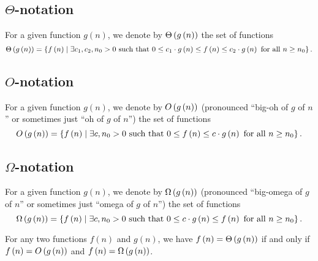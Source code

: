 \subsection{$\Theta$-notation}
\begin{definition}
For a given function $g \left(n\right)$, we denote by $\Theta\left(g \left(n\right) \right)$ the set of functions
\[
\Theta\left(g \left(n\right) \right) = \left\{f\left(n\right) \mid \exists c_1, c_2, n_0 > 0 \text{ such that } 0 \le c_1 \cdot g \left(n\right) \le f \left(n\right) \le c_2 \cdot g \left(n\right) \text{ for all } n \ge n_0 \right\}.
\]
\end{definition}

\subsection{$O$-notation}
\begin{definition}
For a given function $g \left(n\right)$, we denote by $O\left(g \left(n\right) \right)$ (pronounced ``big-oh of $g$ of $n$'' or sometimes just ``oh of $g$ of $n$'') the set of functions
\[
O\left(g \left(n\right) \right) = \left\{f\left(n\right) \mid \exists c, n_0 > 0 \text{ such that } 0 \le f \left(n\right) \le c \cdot g \left(n\right) \text{ for all } n \ge n_0 \right\}.
\]
\end{definition}

\subsection{$\Omega$-notation}
\begin{definition}
For a given function $g \left(n\right)$, we denote by $\Omega\left(g \left(n\right) \right)$ (pronounced ``big-omega of $g$ of $n$'' or sometimes just ``omega of $g$ of $n$'') the set of functions
\[
\Omega\left(g \left(n\right) \right) = \left\{f\left(n\right) \mid \exists c, n_0 > 0 \text{ such that } 0 \le c \cdot g \left(n\right) \le f \left(n\right) \text{ for all } n \ge n_0 \right\}.
\]
\end{definition}

\begin{theorem}
\label{thm:bigtheta}
For any two functions $f\left(n\right)$ and $g\left(n\right)$, we have $f\left(n\right) = \Theta\left(g \left(n\right) \right)$ if and only if $f\left(n\right) = O\left(g \left(n\right) \right)$ and $f\left(n\right) = \Omega\left(g \left(n\right) \right)$.
\end{theorem}

